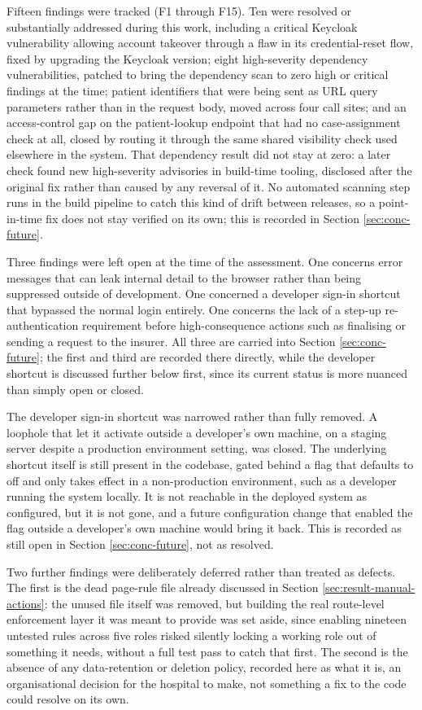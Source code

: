 Fifteen findings were tracked (F1 through F15). Ten were resolved or substantially addressed during this work, including a critical Keycloak vulnerability allowing account takeover through a flaw in its credential-reset flow, fixed by upgrading the Keycloak version; eight high-severity dependency vulnerabilities, patched to bring the dependency scan to zero high or critical findings at the time; patient identifiers that were being sent as URL query parameters rather than in the request body, moved across four call sites; and an access-control gap on the patient-lookup endpoint that had no case-assignment check at all, closed by routing it through the same shared visibility check used elsewhere in the system. That dependency result did not stay at zero: a later check found new high-severity advisories in build-time tooling, disclosed after the original fix rather than caused by any reversal of it. No automated scanning step runs in the build pipeline to catch this kind of drift between releases, so a point-in-time fix does not stay verified on its own; this is recorded in Section \ref{sec:conc-future}.

Three findings were left open at the time of the assessment. One concerns error messages that can leak internal detail to the browser rather than being suppressed outside of development. One concerned a developer sign-in shortcut that bypassed the normal login entirely. One concerns the lack of a step-up re-authentication requirement before high-consequence actions such as finalising or sending a request to the insurer. All three are carried into Section \ref{sec:conc-future}; the first and third are recorded there directly, while the developer shortcut is discussed further below first, since its current status is more nuanced than simply open or closed.

The developer sign-in shortcut was narrowed rather than fully removed. A loophole that let it activate outside a developer's own machine, on a staging server despite a production environment setting, was closed. The underlying shortcut itself is still present in the codebase, gated behind a flag that defaults to off and only takes effect in a non-production environment, such as a developer running the system locally. It is not reachable in the deployed system as configured, but it is not gone, and a future configuration change that enabled the flag outside a developer's own machine would bring it back. This is recorded as still open in Section \ref{sec:conc-future}, not as resolved.

Two further findings were deliberately deferred rather than treated as defects. The first is the dead page-rule file already discussed in Section \ref{sec:result-manual-actions}: the unused file itself was removed, but building the real route-level enforcement layer it was meant to provide was set aside, since enabling nineteen untested rules across five roles risked silently locking a working role out of something it needs, without a full test pass to catch that first. The second is the absence of any data-retention or deletion policy, recorded here as what it is, an organisational decision for the hospital to make, not something a fix to the code could resolve on its own.

